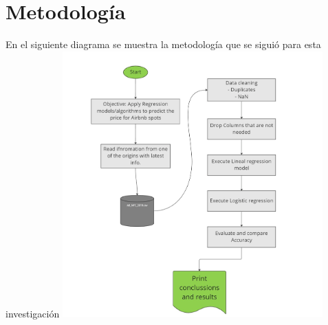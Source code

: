 \documentclass[conference]{IEEEtran}
\begin{document}
\section{Metodología}
En el siguiente diagrama se muestra la metodología que se siguió para esta investigación
\includegraphics[width=10cm]{images/Metodologia.png}
\end{document}
